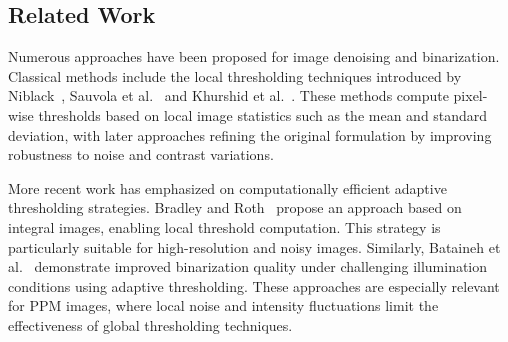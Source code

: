 \subsection{Related Work}\label{subsec:related}

Numerous approaches have been proposed for image denoising and binarization.
Classical methods include the local thresholding techniques introduced by Niblack~\cite{Niblack1985}, Sauvola et al.~\cite{Sauvola1997} and Khurshid et al.~\cite{Khurshid2009}.
These methods compute pixel-wise thresholds based on local image statistics such as the mean and standard deviation, with later approaches refining the original formulation by improving robustness to noise and contrast variations.

More recent work has emphasized on computationally efficient adaptive thresholding strategies. 
Bradley and Roth~\cite{Bradley2007} propose an approach based on integral images, enabling local threshold computation.
This strategy is particularly suitable for high-resolution and noisy images. 
Similarly, Bataineh et al.~\cite{Bataineh2011} demonstrate improved binarization quality under challenging illumination conditions using adaptive thresholding. 
These approaches are especially relevant for PPM images, where local noise and intensity fluctuations limit the effectiveness of global thresholding techniques.
